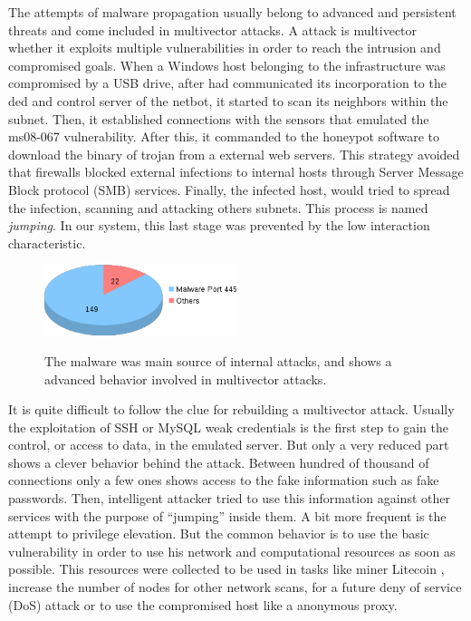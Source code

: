 \documentclass[a4paper]{llncs}
\begin{document}
The attempts of malware propagation usually belong to advanced and persistent threats and come included in multivector attacks. A attack is multivector whether it exploits multiple vulnerabilities in order to reach the intrusion and compromised goals. When a Windows host belonging to the infrastructure was compromised by a USB drive, after had communicated its incorporation to the ded and control server of the netbot, it started to scan its neighbors within the subnet. Then, it established connections with the sensors that  emulated the ms08-067 \cite{ms08067} vulnerability. After this, it commanded to the honeypot software to download the binary of trojan from a external web servers. This strategy avoided that firewalls blocked external infections to internal hosts through Server Message Block protocol (SMB) services. Finally, the infected host, would tried to spread the infection, scanning and attacking others subnets. This process is named {\it jumping}. In our system, this last stage was prevented by the low interaction characteristic.

\begin{figure}[h]
	\includegraphics[width=0.5\textwidth]{internalTypes.png}
	\centering
	\label{fig:internalTypes}
	\caption{The malware was main source of internal attacks, and shows a advanced behavior involved in multivector attacks.}
\end{figure}

It is quite difficult to follow the clue for rebuilding a multivector attack. Usually the exploitation of SSH or MySQL weak credentials is the first step to gain the control, or access to data, in the emulated server. But only a very reduced part shows a clever behavior behind the attack. Between hundred of thousand of connections only a few ones shows access to the fake information such as fake passwords. Then, intelligent attacker tried to use this information against other services with the purpose of  ``jumping'' inside them. A bit more frequent is the attempt to privilege elevation. But the common behavior is to use the basic vulnerability in order to use his network and computational resources as soon as possible. This resources were collected to be used in tasks like miner Litecoin \cite{litecoin}, increase the number of nodes for other network scans, for a future deny of service (DoS) attack or to use the compromised host like a anonymous proxy.
\end{document}

